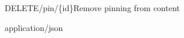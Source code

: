 \begin{apiRoute}{DELETE}{/pin/\{id\}}{Remove pinning from content}
{
}
{ }

\begin{routeParameter} 
\end{routeParameter}
\begin{routeResponse}{application/json}
\end{routeResponse}
\end{apiRoute}




















    

